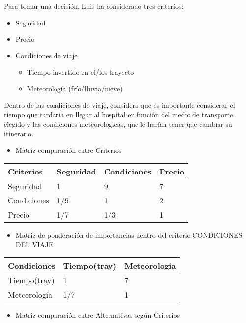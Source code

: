 \documentclass[
]{article}
\providecommand{\tightlist}{%
  \setlength{\itemsep}{0pt}\setlength{\parskip}{0pt}}
\begin{document}
Para tomar una decisión, Luis ha considerado tres criterios:

\begin{itemize}
\item
  Seguridad
\item
  Precio
\item
  Condiciones de viaje

  \begin{itemize}
  \tightlist
  \item
    Tiempo invertido en el/los trayecto
  \item
    Meteorología (frío/lluvia/nieve)
  \end{itemize}
\end{itemize}

Dentro de las condiciones de viaje, considera que es importante
considerar el tiempo que tardaría en llegar al hospital en función del
medio de transporte elegido y las condiciones meteorológicas, que le
harían tener que cambiar su itinerario.

\begin{itemize}
\tightlist
\item
  Matriz comparación entre Criterios
\end{itemize}

\begin{longtable}[]{@{}llll@{}}
\toprule
Criterios & Seguridad & Condiciones & Precio \\
\midrule
\endhead
Seguridad & 1 & 9 & 7 \\
Condiciones & 1/9 & 1 & 2 \\
Precio & 1/7 & 1/3 & 1 \\
\bottomrule
\end{longtable}

\begin{itemize}
\tightlist
\item
  Matriz de ponderación de importancias dentro del criterio CONDICIONES
  DEL VIAJE
\end{itemize}

\begin{longtable}[]{@{}lll@{}}
\toprule
Condiciones & Tiempo(tray) & Meteorología \\
\midrule
\endhead
Tiempo(tray) & 1 & 7 \\
Meteorología & 1/7 & 1 \\
\bottomrule
\end{longtable}

\begin{itemize}
\tightlist
\item
  Matriz comparación entre Alternativas según Criterios
\end{itemize}
\end{document}
